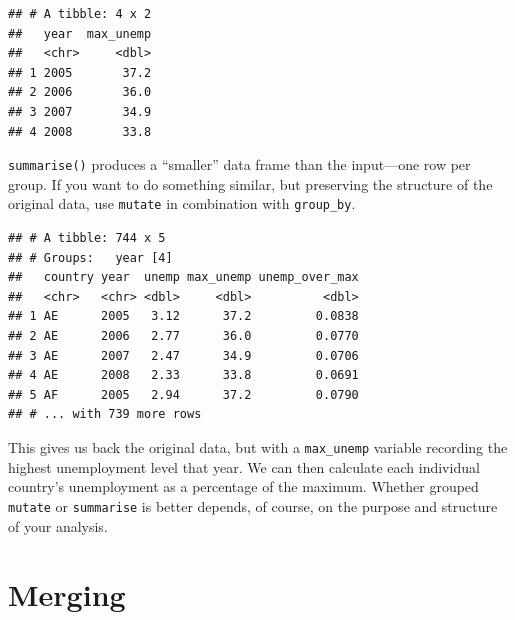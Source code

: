 \documentclass[12pt,oneside,openany]{book}
\newenvironment{Shaded}{\begin{snugshade}}{\end{snugshade}}
\newcommand{\KeywordTok}[1]{\textcolor[rgb]{0.13,0.29,0.53}{\textbf{#1}}}
\newcommand{\DataTypeTok}[1]{\textcolor[rgb]{0.13,0.29,0.53}{#1}}
\newcommand{\StringTok}[1]{\textcolor[rgb]{0.31,0.60,0.02}{#1}}
\newcommand{\OperatorTok}[1]{\textcolor[rgb]{0.81,0.36,0.00}{\textbf{#1}}}
\newcommand{\NormalTok}[1]{#1}
\begin{document}
\begin{verbatim}
## # A tibble: 4 x 2
##   year  max_unemp
##   <chr>     <dbl>
## 1 2005       37.2
## 2 2006       36.0
## 3 2007       34.9
## 4 2008       33.8
\end{verbatim}

\texttt{summarise()} produces a ``smaller'' data frame than the
input---one row per group. If you want to do something similar, but
preserving the structure of the original data, use \texttt{mutate} in
combination with \texttt{group\_by}.

\begin{Shaded}
\end{Shaded}

\begin{verbatim}
## # A tibble: 744 x 5
## # Groups:   year [4]
##   country year  unemp max_unemp unemp_over_max
##   <chr>   <chr> <dbl>     <dbl>          <dbl>
## 1 AE      2005   3.12      37.2         0.0838
## 2 AE      2006   2.77      36.0         0.0770
## 3 AE      2007   2.47      34.9         0.0706
## 4 AE      2008   2.33      33.8         0.0691
## 5 AF      2005   2.94      37.2         0.0790
## # ... with 739 more rows
\end{verbatim}

This gives us back the original data, but with a \texttt{max\_unemp}
variable recording the highest unemployment level that year. We can then
calculate each individual country's unemployment as a percentage of the
maximum. Whether grouped \texttt{mutate} or \texttt{summarise} is better
depends, of course, on the purpose and structure of your analysis.

\section{Merging}\label{merging}
\end{document}
